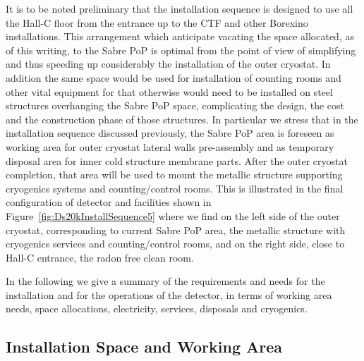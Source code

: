 It is to be noted preliminary that the installation sequence is designed to use all the Hall-C floor from the entrance up to the CTF and other Borexino installations. This arrangement which anticipate vacating the space allocated, as of this writing, to the Sabre PoP is optimal from the point of view of simplifying and thus speeding up considerably the installation of the outer cryostat. In addition the same space would be used for installation of counting rooms and other vital equipment for 
\DSk that otherwise would need to be installed on steel structures overhanging the Sabre PoP space, complicating the design, the cost and the construction phase of those structures.
In particular we stress that in the installation sequence discussed previously, the Sabre PoP area is foreseen as working area for outer cryostat lateral walls pre-assembly and as temporary disposal area for inner cold structure membrane parts. After the outer cryostat completion, that area will be used to mount the metallic structure supporting cryogenics systems and counting/control rooms. This is illustrated in the final configuration of \DSk detector and facilities shown in Figure~\ref{fig:Ds20kInstallSequence5} where we find on the left side of the outer cryostat, corresponding to current Sabre PoP area, the metallic structure with cryogenics services and counting/control rooms, and on the right side, close to Hall-C entrance, the radon free clean room. 

\vspace{1cm}

In the following we give a summary of the requirements and needs for the installation and for the operations of the \DSk detector, in terms of working area needs, space allocations, electricity, services, disposals and cryogenics.

\subsection{Installation Space and Working Area}
\label{sec:SpaceAndService}

